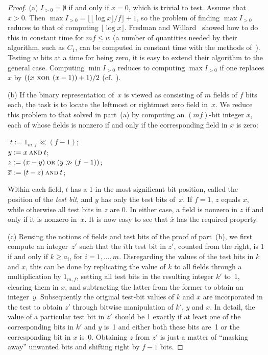 \documentclass[envcountsame,envcountsect,undated,nolinenumbers]{lnthi}
\def\Tfloor#1{\lfloor #1\rfloor}
\begin{document}
\begin{proof}
(a)
$I_{>0}=\emptyset$ if and only if $x=0$,
which is trivial to test.
Assume that $x>0$.
Then $\max I_{>0}=\Tfloor{{{\Tfloor{\log x}}/f}}+1$,
so the problem of finding $\max I_{>0}$
reduces to that of computing $\Tfloor{\log x}$.
Fredman and Willard~\cite[pp.\ 431--432]{FreW93}
showed how to do this in
constant time for $m f\le w$
(a number of quantities needed by their algorithm,
such as $C_1$, can be computed in constant time
with the methods of~\cite{Hag15}).
Testing $w$ bits
at a time for being zero, it is easy to extend
their algorithm to the general case.
Computing
$\min I_{>0}$ reduces to computing $\max I_{>0}$
if one replaces $x$ by
${{((x\textsc{ xor }(x-1))+1)}/2}$
(cf.~\cite[Eq.\ 7.1.3-(40)]{Knu10}).

(b) If the binary representation of~$x$
is viewed as consisting of $m$ fields of $f$ bits each,
the task is to locate the leftmost or rightmost
zero field in~$x$.
We reduce this problem to that solved
in part~(a) by computing an $(m f)$-bit
integer $\overline{x}$, each of whose fields
is nonzero if and only if the corresponding field
in $x$ is zero:

\begin{tabbing}
\quad\=\kill
\>$t:=1_{m,f}\ll(f-1)$;\\
\>$y:=x\mathbin{\textsc{and}}t$;\\
\>$z:=(x-y)\mathbin{\textsc{or}}(y\gg(f-1))$;\\
\>$\overline{x}:=(t-z)\mathbin{\textsc{and}}t$;
\end{tabbing}

\noindent
Within each field, $t$ has a 1 in the most significant
bit position, called the position of the
\emph{test bit}, and
$y$ has only the test bits of~$x$.
If $f=1$, $z$ equals $x$, while otherwise
all test bits in $z$ are 0.
In either case, a field is nonzero in $z$ if
and only if it is nonzero in~$x$.
It is now easy to see that $\overline{x}$
has the required property.

(c) Reusing the notions of fields and test bits
of the proof of part~(b),
we first compute an integer~$z'$ such that the $i$th
test bit in $z'$, counted from the right,
is 1 if and only if $k\ge a_i$,
for $i=1,\ldots,m$.
Disregarding the values of the test bits in $k$
and $x$, this can be done by replicating the
value of $k$ to all fields through a multiplication
by $1_{m,f}$, setting all test bits in the
resulting integer $k'$ to~1, clearing them in $x$,
and subtracting the latter from the former
to obtain an integer~$y$.
Subsequently the original test-bit values of $k$
and $x$ are incorporated in the test to obtain $z'$
through bitwise manipulation of $k'$, $y$ and $x$.
In detail, the value of a particular test bit
in $z'$ should be 1 exactly if at least one of the
corresponding bits in $k'$ and $y$ is~1 and
either both these bits are~1 or the corresponding
bit in $x$ is~0.
Obtaining $z$ from $z'$ is just a matter of
``masking away'' unwanted bits and shifting
right by $f-1$ bits.


\end{proof}
\end{document}
